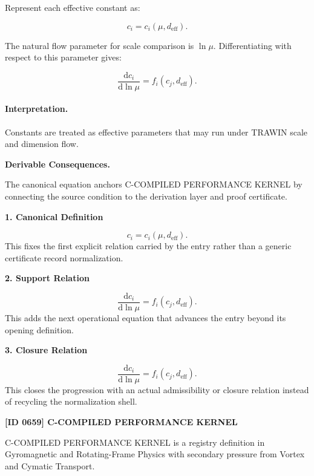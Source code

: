 Represent each effective constant as:

\begin{equation}
c_i=c_i(\mu,d_{\mathrm{eff}}).
\end{equation}

The natural flow parameter for scale comparison is $\ln\mu$.  
Differentiating with respect to this parameter gives:

\begin{equation}
\boxed{
\frac{\mathrm{d}c_i}{\mathrm{d}\ln\mu}
=
f_i(c_j,d_{\mathrm{eff}}).
}
\end{equation}

\paragraph{Interpretation.}
Constants are treated as effective parameters that may run under TRAWIN scale and dimension flow.

\par\vspace{0.35em}
\noindent\textbf{Derivable Consequences.}\quad
\begingroup
\footnotesize
\raggedright
The canonical equation anchors C-COMPILED PERFORMANCE KERNEL by connecting the source condition to the derivation layer and proof certificate.
\par\endgroup

\noindent\textbf{1. Canonical Definition}\par
\[
c_i=c_i(\mu,d_{\mathrm{eff}}).
\]
\noindent This fixes the first explicit relation carried by the entry rather than a generic certificate record normalization.\par
\noindent\textbf{2. Support Relation}\par
\[
\frac{\mathrm{d}c_i}{\mathrm{d}\ln\mu} = f_i(c_j,d_{\mathrm{eff}}).
\]
\noindent This adds the next operational equation that advances the entry beyond its opening definition.\par
\noindent\textbf{3. Closure Relation}\par
\[
\boxed{ \frac{\mathrm{d}c_i}{\mathrm{d}\ln\mu} = f_i(c_j,d_{\mathrm{eff}}). }
\]
\noindent This closes the progression with an actual admissibility or closure relation instead of recycling the normalization shell.\par

\clearpage
\noindent\textbf{[ID 0659] C-COMPILED PERFORMANCE KERNEL}\par
\vspace{0.35em}
\begingroup\small
{}
C-COMPILED PERFORMANCE KERNEL is a registry definition in Gyromagnetic and Rotating-Frame Physics with secondary pressure from Vortex and Cymatic Transport.

